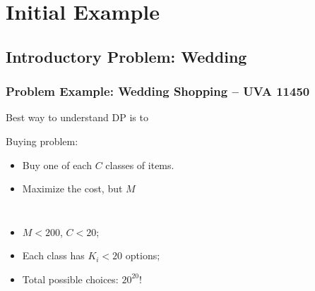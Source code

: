 \documentclass{beamer}
\begin{document}
\section{Initial Example}

\subsection{Introductory Problem: Wedding}

\begin{frame}
    \frametitle{Problem Example: Wedding Shopping -- UVA 11450}

    \begin{block}{}
      Best way to understand DP is to 
    \end{block}

    \vfill
    
    Buying problem:
    \begin{itemize}
    \item Buy one of each $C$ classes of items.
    \item Maximize the cost, but  $M$
    \end{itemize}

    \medskip

    \begin{columns}
      \begin{itemize}
      \item $M < 200$, $C < 20$;
      \item Each class has $K_i < 20$ options;
      \item Total possible choices: $20^{20}$!
      \end{itemize}


\end{columns}
\end{frame}
\end{document}
